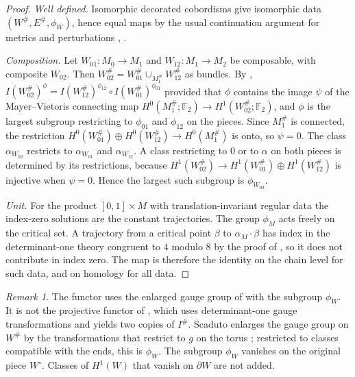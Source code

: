 \documentclass[11pt]{amsart}
\theoremstyle{definition}
\theoremstyle{remark}
\newtheorem{remark}[theorem]{Remark}
\theoremstyle{plain}
\numberwithin{equation}{section}
\newcommand{\FF}{\mathbb{F}_2}
\newcommand{\Ish}{I^{\#}}
\begin{document}
\begin{proof}
\emph{Well defined.} Isomorphic decorated cobordisms give isomorphic
data $(W^\#,E^\#,\phi_W)$, hence equal maps by the usual continuation
argument for metrics and perturbations \cite[Section~3]{KM-unknot},
\cite[Section~5.3]{Donaldson-book}.

\emph{Composition.} Let $W_{01}\colon M_0\to M_1$ and
$W_{12}\colon M_1\to M_2$ be composable, with composite $W_{02}$. Then
$W_{02}^\#=W_{01}^\#\cup_{M_1^\#}W_{12}^\#$ as bundles. By
\cite[Proposition~5.4]{KM-unknot},
$I(W_{02}^\#)^{\phi}=I(W_{12}^\#)^{\phi_{12}}\circ
I(W_{01}^\#)^{\phi_{01}}$ provided that $\phi$ contains the image $\psi$
of the Mayer--Vietoris connecting map
$H^0(M_1^\#;\FF)\to H^1(W_{02}^\#;\FF)$, and $\phi$ is the largest
subgroup restricting to $\phi_{01}$ and $\phi_{12}$ on the pieces. Since
$M_1^\#$ is connected, the restriction
$H^0(W_{01}^\#)\oplus H^0(W_{12}^\#)\to H^0(M_1^\#)$ is onto, so
$\psi=0$. The class $\alpha_{W_{02}}$ restricts to $\alpha_{W_{01}}$ and
$\alpha_{W_{12}}$. A class restricting to $0$ or to $\alpha$ on both
pieces is determined by its restrictions, because
$H^1(W_{02}^\#)\to H^1(W_{01}^\#)\oplus H^1(W_{12}^\#)$ is injective when
$\psi=0$. Hence the largest such subgroup is $\phi_{W_{02}}$.

\emph{Unit.} For the product $[0,1]\times M$ with translation-invariant
regular data the index-zero solutions are the constant trajectories.
The group $\phi_M$ acts freely on the critical set. A trajectory from a
critical point $\beta$ to $\alpha_M\cdot\beta$ has index in the determinant-one theory
congruent to $4$ modulo $8$ by the proof of \cite[Proposition~5.2(a)]{KM-unknot}, so
it does not contribute in index zero. The map is therefore the identity
on the chain level for such data, and on homology for all data.
\end{proof}

\begin{remark}
The functor uses the enlarged gauge group of \cite[Section~5]{KM-unknot}
with the subgroup $\phi_W$. It is not the projective functor of
\cite[Section~4.1]{KM-unknot}, which uses determinant-one gauge
transformations and yields two copies of $\Ish$. Scaduto enlarges the
gauge group on $W^\#$ by the transformations that restrict to $g$ on the
torus \cite[Section~7.2]{Scaduto}; restricted to classes compatible with
the ends, this is $\phi_W$. The subgroup $\phi_W$ vanishes on the
original piece $W^\circ$. Classes of $H^1(W)$ that vanish on $\partial W$
are not added.
\end{remark}
\end{document}

